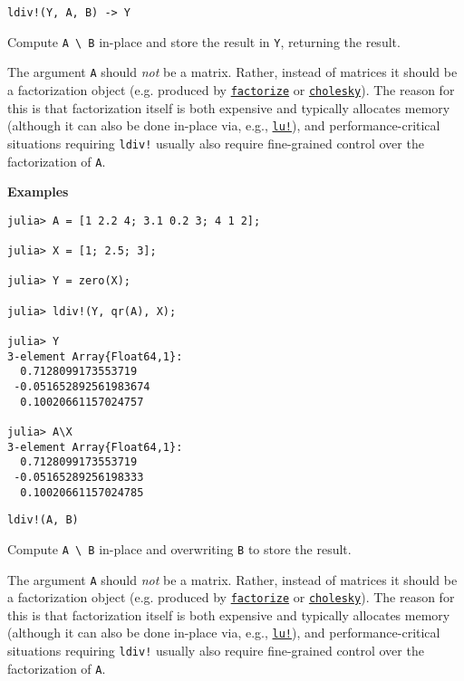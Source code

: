\begin{adjustwidth}{2em}{0pt}


\begin{verbatim}
ldiv!(Y, A, B) -> Y
\end{verbatim}

Compute \texttt{A {\textbackslash} B} in-place and store the result in \texttt{Y}, returning the result.

The argument \texttt{A} should \emph{not} be a matrix.  Rather, instead of matrices it should be a factorization object (e.g. produced by \hyperlink{7042962205548658937}{\texttt{factorize}} or \hyperlink{7653413936706994771}{\texttt{cholesky}}). The reason for this is that factorization itself is both expensive and typically allocates memory (although it can also be done in-place via, e.g., \hyperlink{3268903080173564842}{\texttt{lu!}}), and performance-critical situations requiring \texttt{ldiv!} usually also require fine-grained control over the factorization of \texttt{A}.

\textbf{Examples}


\begin{verbatim}
julia> A = [1 2.2 4; 3.1 0.2 3; 4 1 2];

julia> X = [1; 2.5; 3];

julia> Y = zero(X);

julia> ldiv!(Y, qr(A), X);

julia> Y
3-element Array{Float64,1}:
  0.7128099173553719
 -0.051652892561983674
  0.10020661157024757

julia> A\X
3-element Array{Float64,1}:
  0.7128099173553719
 -0.05165289256198333
  0.10020661157024785
\end{verbatim}




\begin{lstlisting}
ldiv!(A, B)
\end{lstlisting}

Compute \texttt{A {\textbackslash} B} in-place and overwriting \texttt{B} to store the result.

The argument \texttt{A} should \emph{not} be a matrix.  Rather, instead of matrices it should be a factorization object (e.g. produced by \hyperlink{7042962205548658937}{\texttt{factorize}} or \hyperlink{7653413936706994771}{\texttt{cholesky}}). The reason for this is that factorization itself is both expensive and typically allocates memory (although it can also be done in-place via, e.g., \hyperlink{3268903080173564842}{\texttt{lu!}}), and performance-critical situations requiring \texttt{ldiv!} usually also require fine-grained control over the factorization of \texttt{A}.


\end{adjustwidth}
